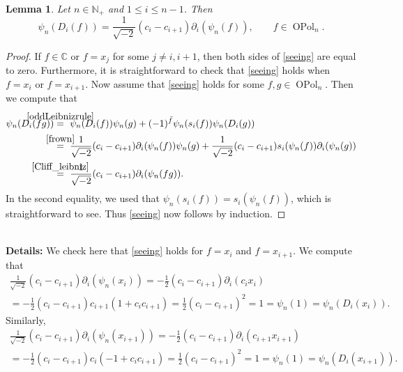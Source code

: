 \documentclass[11pt]{amsart}
\newcommand{\details}[1]{
      \ \\
      {\color{OliveGreen}
        \textbf{Details:} #1
      }
      \\
  }
\newcommand{\details}[1]{}
\newtheorem{lem}[theo]{Lemma}
\theoremstyle{definition}
\numberwithin{equation}{section}
\begin{document}
\begin{lem}
Let $ n \in \mathbb{N}_{+} $ and $ 1 \leq i \leq n-1 $. Then
\begin{equation} \label{seeing}
\psi_{n}(D_{i}(f)) = \frac{1}{\sqrt{-2}}(c_{i}-c_{i+1})\partial_{i}(\psi_{n}(f)), \qquad f \in \operatorname{OPol}_{n}.
\end{equation}
\end{lem}

\begin{proof}
If $ f \in \mathbb{C} $ or $ f = x_{j} $ for some $ j \neq i,i+1 $, then both sides of \cref{seeing} are equal to zero. Furthermore, it is straightforward to check that \cref{seeing} holds when $ f = x_{i} $ or $ f = x_{i+1} $. Now assume that \cref{seeing} holds for some $ f,g \in \operatorname{OPol}_{n} $. Then we compute that
\begin{align*}
\psi_{n}(D_{i}(fg)) &\stackrel{\mathclap{\cref{oddLeibnizrule}}}{=} \ \psi_{n}(D_{i}(f))\psi_{n}(g) + (-1)^{\bar{f}}\psi_{n}(s_{i}(f))\psi_{n}(D_{i}(g))
\\ &\stackrel{\mathclap{\cref{frown}}}{=} \ \frac{1}{\sqrt{-2}}(c_{i}-c_{i+1})\partial_{i}(\psi_{n}(f))\psi_{n}(g) + \frac{1}{\sqrt{-2}}(c_{i}-c_{i+1})s_{i}(\psi_{n}(f))\partial_{i}(\psi_{n}(g))
\\ &\stackrel{\mathclap{\cref{Cliff_leibniz}}}{=} \ \frac{1}{\sqrt{-2}}(c_{i}-c_{i+1})\partial_{i}(\psi_{n}(fg)).
\end{align*}
In the second equality, we used that $ \psi_{n}(s_{i}(f)) = s_{i}(\psi_{n}(f)) $, which is straightforward to see. Thus \cref{seeing} now follows by induction.
\end{proof}

\details{We check here that \cref{seeing} holds for $ f = x_{i} $ and $ f = x_{i+1} $. We compute that
\begin{multline*}
\frac{1}{\sqrt{-2}}(c_{i}-c_{i+1})\partial_{i}(\psi_{n}(x_{i})) = -\frac{1}{2}(c_{i}-c_{i+1})\partial_{i}(c_{i}x_{i}) 
\\ = -\frac{1}{2}(c_{i}-c_{i+1})c_{i+1}(1+c_{i}c_{i+1}) = \frac{1}{2}(c_{i}-c_{i+1})^{2} = 1 = \psi_{n}(1) = \psi_{n}(D_{i}(x_{i})).
\end{multline*}
Similarly, 
\begin{multline*}
\frac{1}{\sqrt{-2}}(c_{i}-c_{i+1})\partial_{i}(\psi_{n}(x_{i+1})) = -\frac{1}{2}(c_{i}-c_{i+1})\partial_{i}(c_{i+1}x_{i+1}) 
\\ = -\frac{1}{2}(c_{i}-c_{i+1})c_{i}(-1+c_{i}c_{i+1}) = \frac{1}{2}(c_{i}-c_{i+1})^{2} = 1 = \psi_{n}(1) = \psi_{n}(D_{i}(x_{i+1})).
\end{multline*}}
\end{document}
